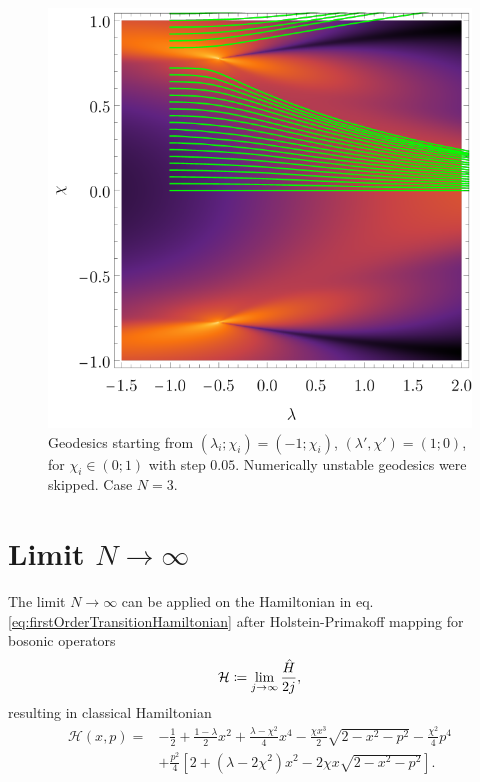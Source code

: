 \begin{figure}[h]
    \centering
    \includegraphics{../img/N=3_geodesics_lambdaIn=-1.pdf}
    \caption{Geodesics starting from $(\lambda_i;\chi_i)=(-1;\chi_i)$, $(\lambda',\chi')=(1;0)$, for $\chi_i\in(0;1)$ with step $0.05$. Numerically unstable geodesics were skipped. Case $N=3$.}
    \label{fig:N=3_geodesics_lambdaIn=-1}    
\end{figure}



\newpage
\section{Limit \texorpdfstring{$N\rightarrow \infty$}{N->infty}}
The limit $N\rightarrow \infty$ can be applied on the Hamiltonian in eq. \ref{eq:firstOrderTransitionHamiltonian} after Holstein-Primakoff mapping for bosonic operators
\begin{equation}
    \mathcal{H}\coloneqq\lim_{j\rightarrow\infty}\frac{\hat{H}}{2j},
\end{equation}
resulting in classical Hamiltonian
\begin{equation}
    \begin{split}
        \mathcal{H}(x,p)=&-\frac{1}{2}+\frac{1-\lambda}{2}x^2+\frac{\lambda-\chi^2}{4}x^4-\frac{\chi x^3}{2}\sqrt{2-x^2-p^2}-\frac{\chi^2}{4}p^4\\
        &+\frac{p^2}{4}\left[2+(\lambda-2\chi^2)x^2-2\chi x\sqrt{2-x^2-p^2}\right].
    \end{split}
    \label{eq:HamiltonianClassicalLimit}
\end{equation}




